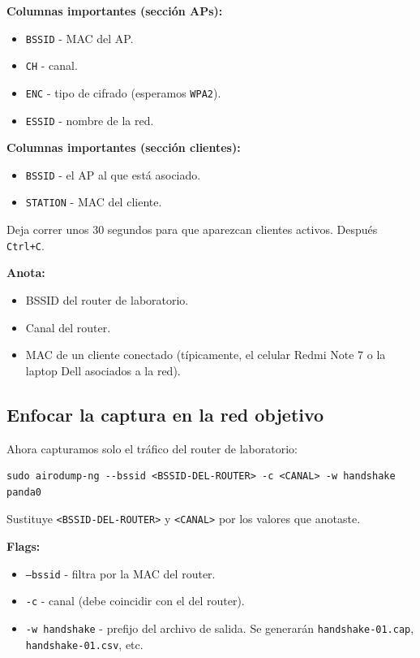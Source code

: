 \documentclass[11pt,a4paper]{article}
\begin{document}
\textbf{Columnas importantes (sección APs):}

\begin{itemize}
  \item \texttt{BSSID} - MAC del AP.
  \item \texttt{CH} - canal.
  \item \texttt{ENC} - tipo de cifrado (esperamos \texttt{WPA2}).
  \item \texttt{ESSID} - nombre de la red.
\end{itemize}

\textbf{Columnas importantes (sección clientes):}

\begin{itemize}
  \item \texttt{BSSID} - el AP al que está asociado.
  \item \texttt{STATION} - MAC del cliente.
\end{itemize}

Deja correr unos 30 segundos para que aparezcan clientes activos. Después
\texttt{Ctrl+C}.

\textbf{Anota:}

\begin{itemize}
  \item BSSID del router de laboratorio.
  \item Canal del router.
  \item MAC de un cliente conectado (típicamente, el celular Redmi Note 7
    o la laptop Dell asociados a la red).
\end{itemize}

\subsection{Enfocar la captura en la red objetivo}
Ahora capturamos solo el tráfico del router de laboratorio:

\begin{lstlisting}
sudo airodump-ng --bssid <BSSID-DEL-ROUTER> -c <CANAL> -w handshake panda0
\end{lstlisting}

Sustituye \texttt{<BSSID-DEL-ROUTER>} y \texttt{<CANAL>} por los valores
que anotaste.

\textbf{Flags:}

\begin{itemize}
  \item \texttt{--bssid} - filtra por la MAC del router.
  \item \texttt{-c} - canal (debe coincidir con el del router).
  \item \texttt{-w handshake} - prefijo del archivo de salida. Se
    generarán \texttt{handshake-01.cap}, \texttt{handshake-01.csv}, etc.
\end{itemize}
\end{document}
